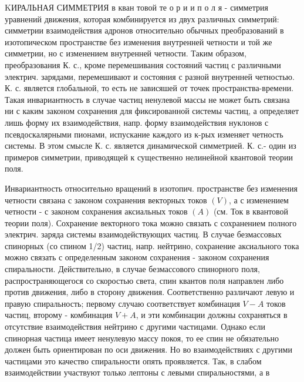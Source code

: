 \documentclass[10pt]{article}
\begin{document}
KИРАЛЬНАЯ СИММЕТРИЯ в кван товой те о р и и п о л я - симметрия уравнений движения, которая комбинируется из двух различных симметрий: симметрии взаимодействия адронов относительно обычных преобразований в изотопическом пространстве без изменения внутренней четности и той же симметрии, но с изменением внутренней четности. Таким образом, преобразования К. с., кроме перемешивания состояний частиц с различными электрич. зарядами, перемешивают и состояния с разной внутренней четностью. К. с. является глобальной, то есть не зависяшей от точек пространства-времени. Такая инвариантность в случае частиц ненулевой массы не может быть связана ни с каким законом сохранения для фиксированной системы частиц, а определяет лишь форму их взаимодействия, напр. форму взаимодействия нуклонов с псевдоскалярными пионами, испускание каждого из к-рых изменяет четность системы. В этом смысле К. с. является динамической симметрией. К. с.- один из примеров симметрии, приводящей к существенно нелинейной квантовой теории поля.



Инвариантность относительно вращений в изотопич. пространстве без изменения четности связана с законом сохранения векторных токов $(V)$, а с изменением четности - с законом сохранения аксиальных токов $(A)$ (см. Ток в квантовой теории поля). Сохранение векторного тока можно связать с сохранением полного электрич. заряда системы взаимодействующих частиц. В случае безмассовых спинорных (со спином 1/2) частиц, напр. нейтрино, сохранение аксиального тока можно связать с определенным законом сохранения - законом сохранения спиральности. Действительно, в случае безмассового спинорного поля, распространяющегося со скоростью света, спин квантов поля направлен либо против движения, либо в сторону движения. Соответственно различают левую и правую спиральность; первому случаю соответствует комбинация $V-A$ токов частиц, второму - комбинация $V+A$, и эти комбинации должны сохраняться в отсутствие взаимодействия нейтрино с другими частицами. Однако если спинорная частица имеет ненулевую массу покоя, то ее спин не обязательно должен быть ориентирован по оси движения. Но во взаимодействиях с другими частицами это качество спиральности опять проявляется. Так, в слабом взаимодействии участвуют только лептоны с левыми спиральностями, а в
\end{document}
